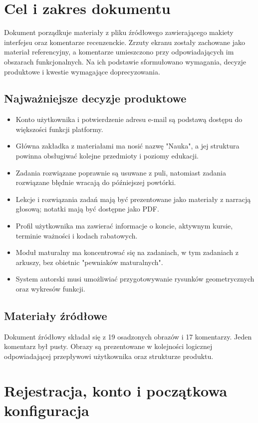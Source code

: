 \documentclass[12pt,a4paper]{report}
\begin{document}
\ElearnFrontMatter
\chapter{Cel i zakres dokumentu}

Dokument porządkuje materiały z pliku źródłowego zawierającego makiety interfejsu oraz komentarze recenzenckie. Zrzuty ekranu zostały zachowane jako materiał referencyjny, a komentarze umieszczono przy odpowiadających im obszarach funkcjonalnych. Na ich podstawie sformułowano wymagania, decyzje produktowe i kwestie wymagające doprecyzowania.

\section{Najważniejsze decyzje produktowe}
\begin{itemize}
  \item Konto użytkownika i potwierdzenie adresu e-mail są podstawą dostępu do większości funkcji platformy.
  \item Główna zakładka z materiałami ma nosić nazwę "Nauka", a jej struktura powinna obsługiwać kolejne przedmioty i poziomy edukacji.
  \item Zadania rozwiązane poprawnie są usuwane z puli, natomiast zadania rozwiązane błędnie wracają do późniejszej powtórki.
  \item Lekcje i rozwiązania zadań mają być prezentowane jako materiały z narracją głosową; notatki mają być dostępne jako PDF.
  \item Profil użytkownika ma zawierać informacje o koncie, aktywnym kursie, terminie ważności i kodach rabatowych.
  \item Moduł maturalny ma koncentrować się na zadaniach, w tym zadaniach z arkuszy, bez obietnic "pewniaków maturalnych".
  \item System autorski musi umożliwiać przygotowywanie rysunków geometrycznych oraz wykresów funkcji.
\end{itemize}
\section{Materiały źródłowe}

Dokument źródłowy składał się z 19 osadzonych obrazów i 17 komentarzy. Jeden komentarz był pusty. Obrazy są prezentowane w kolejności logicznej odpowiadającej przepływowi użytkownika oraz strukturze produktu.

\chapter{Rejestracja, konto i początkowa konfiguracja}
\end{document}
